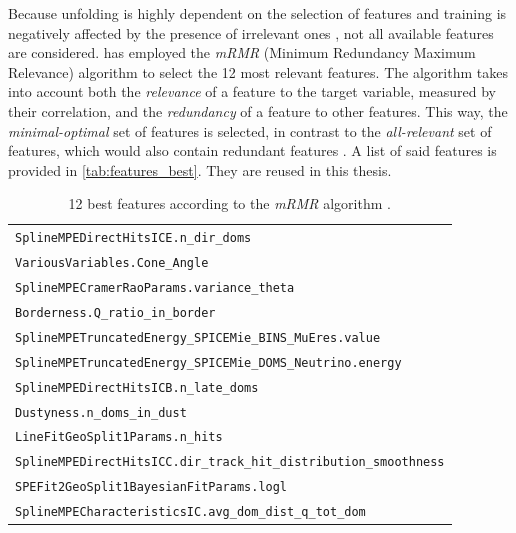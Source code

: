 Because
  unfolding is highly dependent on the selection of features \cite{dsea_jan} %
  and training is negatively affected by the presence of irrelevant ones \cite{dash1997},
not all available features are considered.
%
\citeauthor{dsea_jan} \cite{dsea_jan} has employed the \emph{mRMR} (Minimum Redundancy Maximum Relevance) algorithm \cite{mrmr}
to select the 12 most relevant features.
The algorithm takes into account both
  the \emph{relevance} of a feature to the target variable,
    measured by their correlation,
  and the \emph{redundancy} of a feature to other features.
This way,
the \emph{minimal-optimal} set of features is selected,
  in contrast to the \emph{all-relevant} set of features,
    which would also contain redundant features \citationneeded{}. %
A list of said features is provided in \autoref{tab:features_best}.
They are reused in this thesis.

\begin{table}
    \centering
    \begin{tabular}{l}
        \toprule
        \texttt{SplineMPEDirectHitsICE.n\_dir\_doms} \\
        \texttt{VariousVariables.Cone\_Angle} \\
        \texttt{SplineMPECramerRaoParams.variance\_theta} \\
        \texttt{Borderness.Q\_ratio\_in\_border} \\
        \texttt{SplineMPETruncatedEnergy\_SPICEMie\_BINS\_MuEres.value} \\
        \texttt{SplineMPETruncatedEnergy\_SPICEMie\_DOMS\_Neutrino.energy} \\
        \texttt{SplineMPEDirectHitsICB.n\_late\_doms} \\
        \texttt{Dustyness.n\_doms\_in\_dust} \\
        \texttt{LineFitGeoSplit1Params.n\_hits} \\
        \texttt{SplineMPEDirectHitsICC.dir\_track\_hit\_distribution\_smoothness} \\
        \texttt{SPEFit2GeoSplit1BayesianFitParams.logl} \\
        \texttt{SplineMPECharacteristicsIC.avg\_dom\_dist\_q\_tot\_dom} \\
        \bottomrule
    \end{tabular}
  \caption{
    12 best features according to the \emph{mRMR} algorithm \cite{dsea_jan}.
  }
  \label{tab:features_best}
\end{table}



